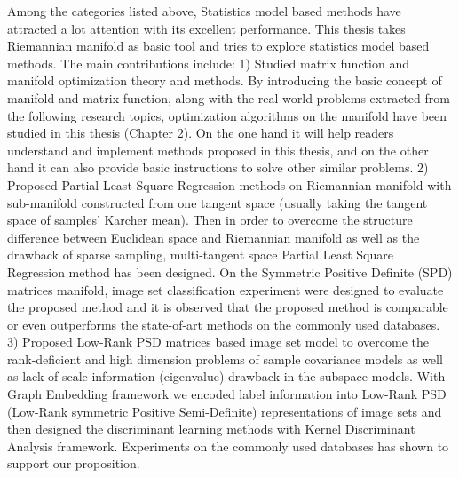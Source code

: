 \begin{eabstract}
Among the categories listed above, Statistics model based methods have attracted a lot attention with its excellent performance. This thesis takes Riemannian manifold as basic tool and tries to explore statistics model based methods. The main contributions include: 1) Studied matrix function and manifold optimization theory and methods. By introducing the basic concept of manifold and matrix function, along with the real-world problems extracted from the following research topics, optimization algorithms on the manifold have been studied in this thesis (Chapter 2). On the one hand it will help readers understand and implement methods proposed in this thesis, and on the other hand it can also provide basic instructions to solve other similar problems. 2) Proposed Partial Least Square Regression methods on Riemannian manifold with sub-manifold constructed from one tangent space (usually taking the tangent space of samples’ Karcher mean). Then in order to overcome the structure difference between Euclidean space and Riemannian manifold as well as the drawback of sparse sampling, multi-tangent space Partial Least Square Regression method has been designed. On the Symmetric Positive Definite (SPD) matrices manifold, image set classification experiment were designed to evaluate the proposed method and it is observed that the proposed method is comparable or even outperforms the state-of-art methods on the commonly used databases. 3) Proposed Low-Rank PSD matrices based image set model to overcome the rank-deficient and high dimension problems of sample covariance models as well as lack of scale information (eigenvalue) drawback in the subspace models. With Graph Embedding framework we encoded label information into Low-Rank PSD (Low-Rank symmetric Positive Semi-Definite) representations of image sets and then designed the discriminant learning methods with Kernel Discriminant Analysis framework. Experiments on the commonly used databases has shown to support our proposition.

%
%
\end{eabstract}

